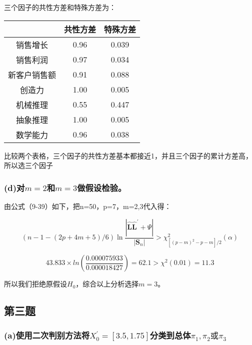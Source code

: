 \documentclass[
]{article}
\begin{document}
三个因子的共性方差和特殊方差为：

\begin{longtable}[]{@{}ccc@{}}
\toprule
& 共性方差 & 特殊方差\tabularnewline
\midrule
\endhead
销售增长 & 0.96 & 0.039\tabularnewline
销售利润 & 0.97 & 0.034\tabularnewline
新客户销售额 & 0.91 & 0.088\tabularnewline
创造力 & 1.00 & 0.005\tabularnewline
机械推理 & 0.55 & 0.447\tabularnewline
抽象推理 & 1.00 & 0.005\tabularnewline
数学能力 & 0.96 & 0.038\tabularnewline
\bottomrule
\end{longtable}

比较两个表格，三个因子的共性方差基本都接近1，并且三个因子的累计方差高，所以选三个因子

\hypertarget{dux5bf9m2ux548cm3ux505aux5047ux8bbeux68c0ux9a8c}{%
\subsubsection{\texorpdfstring{(d)对\(m=2\)和\(m=3\)做假设检验。}{(d)对m=2和m=3做假设检验。}}\label{dux5bf9m2ux548cm3ux505aux5047ux8bbeux68c0ux9a8c}}

由公式（9-39）如下，把n=50，p=7，m=2,3代入得：

\[(n-1-(2 p+4 m+5) / 6) \ln \frac{\left|\hat{\mathbf{L}} \hat{\mathbf{L}}^{\prime}+\hat{\Psi}\right|}{\left|\mathbf{S}_{n}\right|}>\chi^{2}_{\left[(p-m)^{2}-p-m\right] / 2}(\alpha)\]

\[43.833\times ln(\frac{0.000075933}{0.000018427})=62.1>\chi^{2}(0.01)=11.3\]

所以我们拒绝原假设\(H_{0}\)，综合以上分析选择\(m=3\)。

\hypertarget{ux7b2cux4e09ux9898}{%
\subsection{第三题}\label{ux7b2cux4e09ux9898}}

\hypertarget{aux4f7fux7528ux4e8cux6b21ux5224ux522bux65b9ux6cd5ux5c06x_03.51.75ux5206ux7c7bux5230ux603bux4f53pi_1pi_2ux6216pi_3}{%
\subsubsection{\texorpdfstring{(a)使用二次判别方法将\(X_{0}^{'}=[3.5,1.75]\)分类到总体\(\pi_{1},\pi_{2}或\pi_{3}\)}{(a)使用二次判别方法将X\_\{0\}\^{}\{'\}={[}3.5,1.75{]}分类到总体\textbackslash pi\_\{1\},\textbackslash pi\_\{2\}或\textbackslash pi\_\{3\}}}\label{aux4f7fux7528ux4e8cux6b21ux5224ux522bux65b9ux6cd5ux5c06x_03.51.75ux5206ux7c7bux5230ux603bux4f53pi_1pi_2ux6216pi_3}}
\end{document}
